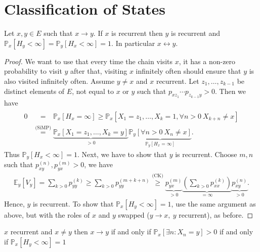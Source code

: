 \section{Classification of States}
\begin{theorem}[]
	Let $x,y \in E$ such that $x \to y$. If $x $ is recurrent then $y$ is recurrent and $\mathbb{P}_{x} \left[ H_y<\infty \right] = \mathbb{P}_{y} \left[ H_x<\infty \right]=1 $.
	In particular $x \leftrightarrow y$.
\end{theorem}
\begin{proof}
	We want to use that every time the chain visits $x$, it has a non-zero probability to visit $y$ after that, visiting $x$ infinitely often should ensure that $y$ is also visited infinitely often.
	Assume $y \neq x$ and $x$ recurrent. Let $z_1, \ldots, z_{k-1}$ be distinct elements of $E$, not equal to $x$ or $y$ such that $p_{xz_1}\cdots p_{z_{k-1}y}>0$. Then we have
	\begin{align}
		0 &\stackrel{\phantom{\textrm{(SiMP)}}}{=} \mathbb{P}_{x} \left[ H_x = \infty \right]  
			\geq \mathbb{P}_{x} \left[ X_1=z_1, \ldots, X_k=1, \forall n> 0\ X_{k+n} \neq x \right]  \\
		  &\stackrel{\textrm{(SiMP)}}{=} \underbrace{\mathbb{P}_{x} \left[ X_1 = z_1, \ldots, X_k=y \right]}_{>0}
		  \underbrace{\mathbb{P}_{y} \left[ \forall n> 0\ X_n \neq x \right]}_{\mathbb{P}_{y} \left[ H_x = \infty \right]}  
	.\end{align}
Thus $\mathbb{P}_{y} \left[ H_x < \infty \right] =1$.
Next, we have to show that $y$ is recurrent. Choose $m,n$ such that $p_{xy}^{(n)}, p_{yx}^{(m)}>0$, we have
\begin{align}
	\mathbb{E}_{y} \left[ V_y \right] = \sum_{k> 0}^{} p_{yy}^{(k)} \geq \sum_{k> 0}^{} p_{yy}^{(m+k+n)} \stackrel{\textrm{(CK)}}{\geq} \underbrace{p_{yx}^{(m)}}_{>0} \underbrace{\left( \sum_{k> 0}^{} p_{xx}^{(k)} \right)}_{=\infty} \underbrace{ p_{xy}^{(n)}}_{> 0}.
\end{align}
Hence, $y$ is recurrent. To show that $\mathbb{P}_{x} \left[ H_y < \infty \right] = 1$, use {\color{blue}the same argument as above, but with the roles of $x$ and $y$ swapped }($y \to x,\ y$ recurrent), as before.
\end{proof}


\begin{rmk}[]
	{\color{blue} $x$ recurrent and} $x \neq y$ then $ x \to y$ if and only if $\mathbb{P}_{x} \left[ \exists n: X_n=y \right]>0$ if and only if $ \mathbb{P}_{x} \left[ H_y<\infty \right]=1 $
\end{rmk}

